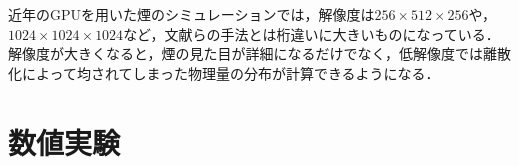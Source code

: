 \documentclass[10pt,a4paper,notitlepage,oneside,twocolumn]{abst_jsarticle}
\begin{document}
近年のGPUを用いた煙のシミュレーションでは，解像度は$256\times512\times256$や，$1024\times1024\times1024$など，文献\cite{fedkiw}らの手法とは桁違いに大きいものになっている．解像度が大きくなると，煙の見た目が詳細になるだけでなく，低解像度では離散化によって均されてしまった物理量の分布が計算できるようになる．

\section{数値実験}
\end{document}
